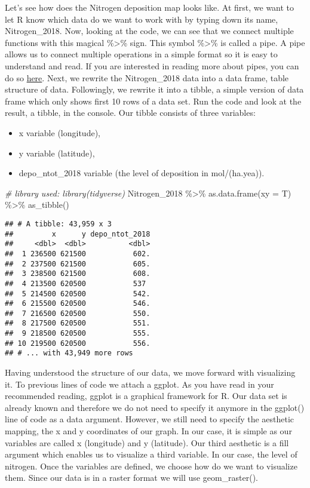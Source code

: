 \documentclass[
]{article}
\newenvironment{Shaded}{\begin{snugshade}}{\end{snugshade}}
\newcommand{\AttributeTok}[1]{\textcolor[rgb]{0.77,0.63,0.00}{#1}}
\newcommand{\CommentTok}[1]{\textcolor[rgb]{0.56,0.35,0.01}{\textit{#1}}}
\newcommand{\FunctionTok}[1]{\textcolor[rgb]{0.00,0.00,0.00}{#1}}
\newcommand{\NormalTok}[1]{#1}
\newcommand{\SpecialCharTok}[1]{\textcolor[rgb]{0.00,0.00,0.00}{#1}}
\providecommand{\tightlist}{%
  \setlength{\itemsep}{0pt}\setlength{\parskip}{0pt}}
\begin{document}
Let's see how does the Nitrogen deposition map looks like. At first, we
want to let R know which data do we want to work with by typing down its
name, Nitrogen\_2018. Now, looking at the code, we can see that we
connect multiple functions with this magical \%\textgreater\% sign. This
symbol \%\textgreater\% is called a pipe. A pipe allows us to connect
multiple operations in a simple format so it is easy to understand and
read. If you are interested in reading more about pipes, you can do so
\href{https://r4ds.had.co.nz/pipes.html}{here}. Next, we rewrite the
Nitrogen\_2018 data into a data frame, table structure of data.
Followingly, we rewrite it into a tibble, a simple version of data frame
which only shows first 10 rows of a data set. Run the code and look at
the result, a tibble, in the console. Our tibble consists of three
variables:

\begin{itemize}
\tightlist
\item
  x variable (longitude),
\item
  y variable (latitude),
\item
  depo\_ntot\_2018 variable (the level of deposition in mol/(ha.yea)).
\end{itemize}

\begin{Shaded}
\begin{Highlighting}[]
\CommentTok{\# library used: library(tidyverse)}
\NormalTok{Nitrogen\_2018 }\SpecialCharTok{\%\textgreater{}\%} 
  \FunctionTok{as.data.frame}\NormalTok{(}\AttributeTok{xy =}\NormalTok{ T) }\SpecialCharTok{\%\textgreater{}\%} 
  \FunctionTok{as\_tibble}\NormalTok{() }
\end{Highlighting}
\end{Shaded}

\begin{verbatim}
## # A tibble: 43,959 x 3
##         x      y depo_ntot_2018
##     <dbl>  <dbl>          <dbl>
##  1 236500 621500           602.
##  2 237500 621500           605.
##  3 238500 621500           608.
##  4 213500 620500           537 
##  5 214500 620500           542.
##  6 215500 620500           546.
##  7 216500 620500           550.
##  8 217500 620500           551.
##  9 218500 620500           555.
## 10 219500 620500           556.
## # ... with 43,949 more rows
\end{verbatim}

Having understood the structure of our data, we move forward with
visualizing it. To previous lines of code we attach a ggplot. As you
have read in your recommended reading, ggplot is a graphical framework
for R. Our data set is already known and therefore we do not need to
specify it anymore in the ggplot() line of code as a data argument.
However, we still need to specify the aesthetic mapping, the x and y
coordinates of our graph. In our case, it is simple as our variables are
called x (longitude) and y (latitude). Our third aesthetic is a fill
argument which enables us to visualize a third variable. In our case,
the level of nitrogen. Once the variables are defined, we choose how do
we want to visualize them. Since our data is in a raster format we will
use geom\_raster().
\end{document}
